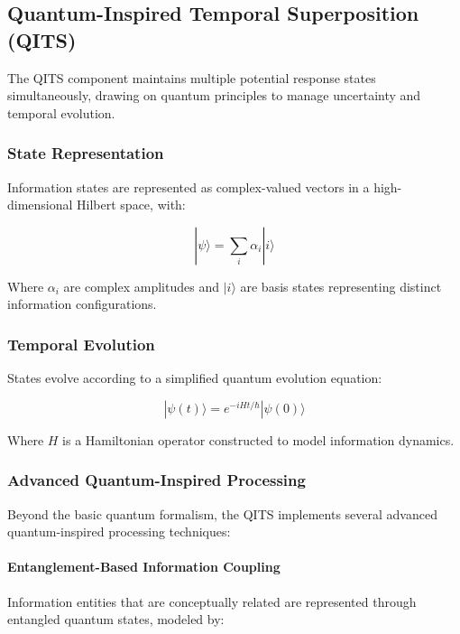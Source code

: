 \documentclass[journal,onecolumn]{IEEEtran}
\begin{document}
\subsection{Quantum-Inspired Temporal Superposition (QITS)}

The QITS component maintains multiple potential response states simultaneously, drawing on quantum principles to manage uncertainty and temporal evolution.

\subsubsection{State Representation}

Information states are represented as complex-valued vectors in a high-dimensional Hilbert space, with:

\begin{equation}
|\psi\rangle = \sum_i \alpha_i |i\rangle
\end{equation}

Where $\alpha_i$ are complex amplitudes and $|i\rangle$ are basis states representing distinct information configurations.

\subsubsection{Temporal Evolution}

States evolve according to a simplified quantum evolution equation:

\begin{equation}
|\psi(t)\rangle = e^{-iHt/\hbar}|\psi(0)\rangle
\end{equation}

Where $H$ is a Hamiltonian operator constructed to model information dynamics.

\subsubsection{Advanced Quantum-Inspired Processing}

Beyond the basic quantum formalism, the QITS implements several advanced quantum-inspired processing techniques:

\paragraph{Entanglement-Based Information Coupling}
Information entities that are conceptually related are represented through entangled quantum states, modeled by:
\end{document}
